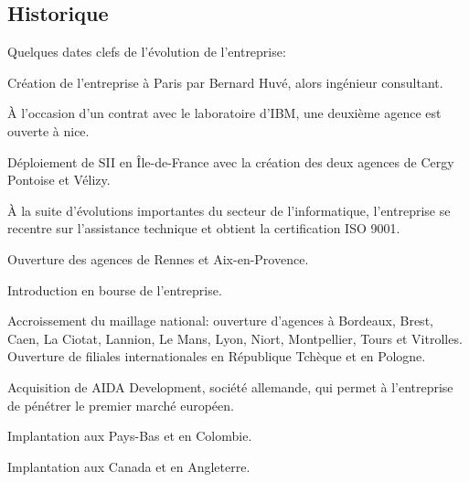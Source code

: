 {{{			%
		}
		\subsection{Historique}
			
			\par
			{
				Quelques dates clefs de l'évolution de l'entreprise:
			}
			
			\begin{description}
			{
				\item[1979:] Création de l'entreprise à Paris par Bernard Huvé, alors ingénieur consultant.
				\item[1984:] À l'occasion d'un contrat avec le laboratoire d'IBM, une deuxième agence est ouverte à nice.
				\item[1987-1989:] Déploiement de SII en Île-de-France avec la création des deux agences de Cergy Pontoise et Vélizy.
				\item[1992:] À la suite d'évolutions importantes du secteur de l'informatique, l'entreprise se recentre sur l'assistance technique et obtient la certification ISO 9001.
				\item[1997:] Ouverture des agences de Rennes et Aix-en-Provence.
				\item[1999:] Introduction en bourse de l'entreprise.
				\item[2000-2007:] Accroissement du maillage national: ouverture d'agences à Bordeaux, Brest, Caen, La Ciotat, Lannion, Le Mans, Lyon, Niort, Montpellier, Tours et Vitrolles. Ouverture de filiales internationales en République Tchèque et en Pologne.
				\item[2010:] Acquisition de AIDA Development, société allemande, qui permet à l'entreprise de pénétrer le premier marché européen.
				\item[2015:] Implantation aux Pays-Bas et en Colombie.
				\item[2016:] Implantation aux Canada et en Angleterre.
			}
			\end{description}
	}
}
